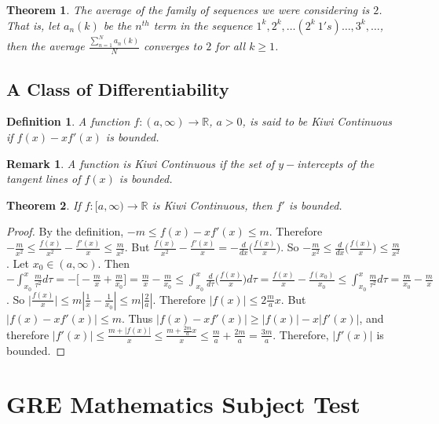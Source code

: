 \documentclass[12pt,oneside]{book}
\theoremstyle{mystyle}
\newtheorem{theorem}{Theorem}[section]
\newtheorem{definition}{Definition}[section]
\newtheorem{remark}{Remark}[section]
\begin{document}
%
\begin{theorem}
The average of the family of sequences we were considering is $2$. That is, let $a_n(k)$ be the $n^{th}$ term in the sequence $1^k, 2^k, \hdots (2^k\ 1's)\hdots,3^k,\hdots$, then the average $\frac{\sum_{n=1}^{N} a_n(k)}{N}$ converges to $2$ for all $k\geq 1$.
\end{theorem}
%
\section{A Class of Differentiability}
%
\begin{definition}
A function $f:(a,\infty)\rightarrow \mathbb{R}$, $a>0$, is said to be Kiwi Continuous if $f(x)-xf'(x)$ is bounded.
\end{definition}
%
\begin{remark}
A function is Kiwi Continuous if the set of $y-$intercepts of the tangent lines of $f(x)$ is bounded. 
\end{remark}

\begin{theorem}
If $f:[a,\infty)\rightarrow \mathbb{R}$ is Kiwi Continuous, then $f'$ is bounded.
\end{theorem}
\begin{proof}
By the definition, $-m \leq f(x)-xf'(x)\leq m$. Therefore $-\frac{m}{x^2} \leq \frac{f(x)}{x^2}- \frac{f'(x)}{x} \leq \frac{m}{x^2}$. But $\frac{f(x)}{x^2} - \frac{f'(x)}{x} = -\frac{d}{dx}\big(\frac{f(x)}{x}\big)$. So $-\frac{m}{x^2} \leq \frac{d}{dx}\big(\frac{f(x)}{x}\big) \leq \frac{m}{x^2}$. Let $x_0 \in (a,\infty)$. Then $-\int_{x_0}^x \frac{m}{\tau^2}d\tau = -\big[-\frac{m}{x}+ \frac{m}{x_0}\big] = \frac{m}{x}- \frac{m}{x_0} \leq \int_{x_0}^{x}\frac{d}{d\tau}\big(\frac{f(x)}{x}\big)d\tau = \frac{f(x)}{x} - \frac{f(x_0)}{x_0} \leq \int_{x_0}^{x} \frac{m}{\tau^2}d\tau = \frac{m}{x_0} - \frac{m}{x}$. So $\big|\frac{f(x)}{x}\big| \leq m|\frac{1}{x} - \frac{1}{x_0}| \leq m|\frac{2}{a}|$. Therefore $|f(x)| \leq 2\frac{m}{a}x$. But $|f(x) - xf'(x)| \leq m$. Thus $|f(x)-xf'(x)| \geq |f(x)| - x|f'(x)|$, and therefore $|f'(x)|  \leq \frac{m+|f(x)|}{x} \leq \frac{m+ \frac{2m}{a}x}{x} \leq \frac{m}{a} + \frac{2m}{a} = \frac{3m}{a}$. Therefore, $|f'(x)|$ is bounded.
\end{proof}
%
\chapter{GRE Mathematics Subject Test}
%
\end{document}

